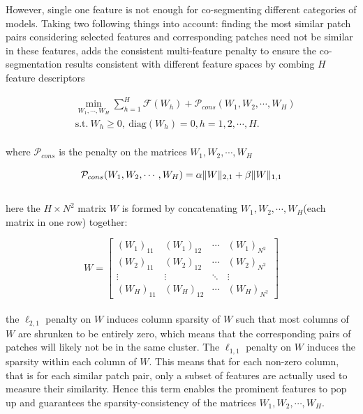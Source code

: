 However, single one feature is not enough for co-segmenting different categories of models.
Taking two following things into account:
finding the most similar patch pairs considering selected features and corresponding patches need not be similar in these features,
\cite{hu2012co} adds the consistent multi-feature penalty to ensure the co-segmentation results consistent with different feature spaces by combing $H$ feature descriptors

\small{
\begin{equation}
 \label{eq:coseg1}
 \begin{split}
 &\min_{W_{1},\cdots,W_{H}}\sum_{h=1}^{H}\mathcal{F}(W_{h})+\mathcal{P}_{cons}(W_1,W_2,\cdots,W_H)\\
 &\mathrm{s.t.}~W_{h}\ge0,~\textrm{diag}(W_{h})=0,h=1,2,\cdots,H.
 \end{split}
\end{equation}
}
\\
where $\mathcal{P}_{cons}$ is the penalty on the matrices $W_1,W_2,\cdots,W_H$

\small{
\begin{equation}
 \label{eq:coseg2}
 \mathcal{P}_{cons}(W_1,W_2,\cdots,W_H)=\alpha\|W\|_{2,1}+\beta\|W\|_{1,1}\\
\end{equation}
}
\\
here the $H\times N^2$ matrix $W$ is formed by concatenating $W_1,W_2,\cdots,W_H$(each matrix in one row) together:

\small{
\begin{equation}
 \label{eq:coseg3}
 W = {\left[ \begin{array}{cccc}
 (W_1)_{11} & (W_1)_{12} & \cdots & (W_1)_{N^2}\\
 (W_2)_{11} & (W_2)_{12} & \cdots & (W_2)_{N^2}\\
 \vdots & \vdots & \ddots & \vdots\\
 (W_{H})_{11} & (W_{H})_{12} & \cdots & (W_{H})_{N^2}
 \end{array}
 \right]}
\end{equation}
}
\\
the $\ell_{2,1}$ penalty on $W$ induces column sparsity of $W$ such that most columns of $W$ are shrunken to be entirely zero, which means that the corresponding pairs of patches will likely not be in the same cluster.
The $\ell_{1,1}$ penalty on $W$ induces the sparsity within each column of $W$.
This means that for each non-zero column, that is for each similar patch pair, only a subset of features are actually used to measure their similarity.
Hence this term enables the prominent features to pop up and guarantees the sparsity-consistency of the matrices $W_1,W_2,\cdots,W_H$.

